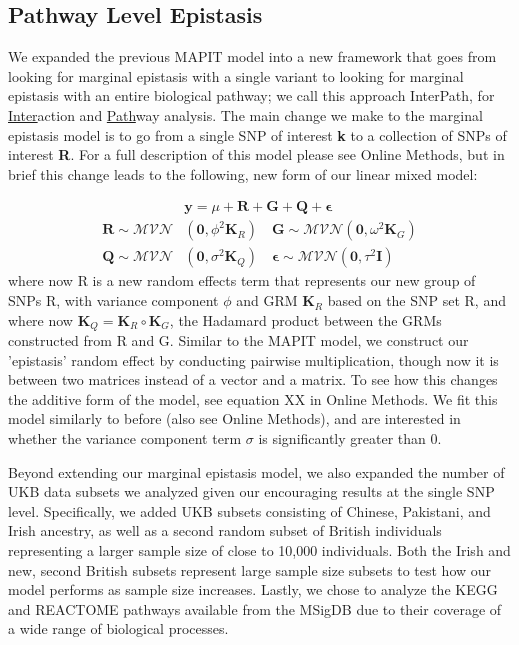 \documentclass[12pt, a4paper]{article}
\begin{document}
\subsection{Pathway Level Epistasis}\label{InterPath-Results-PathwayEpistasis}

We expanded the previous MAPIT model into a new framework that goes from looking for marginal epistasis with a single variant to looking for marginal epistasis with an entire biological pathway; we call this approach InterPath, for \underline{Inter}action and \underline{Path}way analysis. The main change we make to the marginal epistasis model is to go from a single SNP of interest \textbf{k} to a collection of SNPs of interest \textbf{R}. For a full description of this model please see Online Methods, but in brief this change leads to the following, new form of our linear mixed model:

\begin{align}
    & \textbf{y} = \mu + \textbf{R} + \textbf{G} + \textbf{Q} + \boldsymbol{\epsilon} \\
    \textbf{R} \sim \mathcal{MVN}&(\textbf{0}, \phi^{2}\textbf{K}_R) \quad \textbf{G} \sim \mathcal{MVN}(\textbf{0}, \omega^{2}\textbf{K}_G) \nonumber \\ 
    \textbf{Q} \sim \mathcal{MVN}&(\textbf{0}, \sigma^{2}\textbf{K}_Q) \quad \boldsymbol{\epsilon} \sim \mathcal{MVN}(\textbf{0}, \tau^{2}\textbf{I}) \nonumber 
\end{align}
where now R is a new random effects term that represents our new group of SNPs R, with variance component $\phi$ and GRM $\textbf{K}_R$ based on the SNP set R, and where now $\textbf{K}_Q = \textbf{K}_R \circ \textbf{K}_G$, the Hadamard product between the GRMs constructed from R and G. Similar to the MAPIT model, we construct our 'epistasis' random effect by conducting pairwise multiplication, though now it is between two matrices instead of a vector and a matrix. To see how this changes the additive form of the model, see equation XX in Online Methods. We fit this model similarly to before (also see Online Methods), and are interested in whether the variance component term $\sigma$ is significantly greater than 0.

Beyond extending our marginal epistasis model, we also expanded the number of UKB data subsets we analyzed given our encouraging results at the single SNP level. Specifically, we added UKB subsets consisting of Chinese, Pakistani, and Irish ancestry, as well as a second random subset of British individuals representing a larger sample size of close to 10,000 individuals. Both the Irish and new, second British subsets represent large sample size subsets to test how our model performs as sample size increases. Lastly, we chose to analyze the KEGG and REACTOME pathways available from the MSigDB \citep{Liberzon2011} due to their coverage of a wide range of biological processes. 
\end{document}
